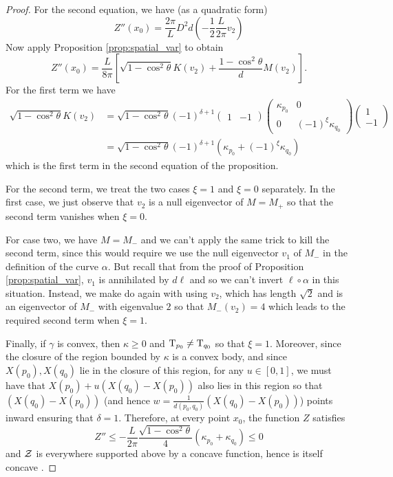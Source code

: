 \documentclass[a4paper, 12pt]{amsart}
\begin{document}
\begin{proof}
For the second equation, we have (as a quadratic form)
\[
Z''(x_0) = \frac{2\pi}{L} D^2 d \left(-\frac{1}{2}\frac{L}{2\pi} v_2\right)
\]
Now apply Proposition \ref{prop:spatial_var} to obtain
\[
Z''(x_0) = \frac{L}{8\pi} \left[\sqrt{1-\cos^2\theta} K (v_2) + \frac{1-\cos^2\theta}{d} M (v_2)\right].
\]
For the first term we have
\begin{align*}
\sqrt{1-\cos^2\theta} K (v_2) &= \sqrt{1-\cos^2\theta} (-1)^{\delta+1} 
\begin{pmatrix}
1 & -1
\end{pmatrix}
\begin{pmatrix}
\kappa_{p_0} & 0 \\
0 & (-1)^{\xi} \kappa_{q_0}
\end{pmatrix}
\begin{pmatrix}
1 \\
-1
\end{pmatrix} \\
&= \sqrt{1-\cos^2\theta} (-1)^{\delta+1} (\kappa_{p_0} + (-1)^{\xi} \kappa_{q_0})
\end{align*}
which is the first term in the second equation of the proposition.

For the second term, we treat the two cases $\xi=1$ and $\xi=0$ separately. In the first case, we just observe that $v_2$ is a null eigenvector of $M=M_+$ so that the second term vanishes when $\xi=0$. 

For case two, we have $M=M_-$ and we can't apply the same trick to kill the second term, since this would require we use the null eigenvector $v_1$ of $M_-$ in the definition of the curve $\alpha$. But recall that from the proof of Proposition \ref{prop:spatial_var}, $v_1$ is annihilated by $d\ell$ and so we can't invert $\ell\circ\alpha$ in this situation. Instead, we make do again with using $v_2$, which has length $\sqrt{2}$ and is an eigenvector of $M_-$ with eigenvalue $2$ so that $M_- (v_2) = 4$ which leads to the required second term when $\xi=1$.

Finally, if $\gamma$ is convex, then $\kappa \geq 0$ and $\operatorname{T}_{p_0} \ne \operatorname{T}_{q_0}$ so that $\xi = 1$. Moreover, since the closure of the region bounded by $\kappa$ is a convex body, and since $X(p_0), X(q_0)$ lie in the closure of this region, for any $u \in [0,1]$, we must have that $X(p_0) + u(X(q_0) - X(p_0))$ also lies in this region so that $(X(q_0) - X(p_0))$ (and hence $w = \tfrac{1}{d(p_0,q_0)} (X(q_0) - X(p_0))$) points inward ensuring that $\delta = 1$. Therefore, at every point $x_0$, the function $Z$ satisfies
\[
Z'' \leq - \frac{L}{2\pi} \frac{\sqrt{1-\cos^2 \theta}}{4} (\kappa_{p_0} + \kappa_{q_0}) \leq 0
\]
and $\operatorname{\mathcal{Z}}$ is everywhere supported above by a concave function, hence is itself concave \cite{MR1674097}.
\end{proof}
\end{document}
